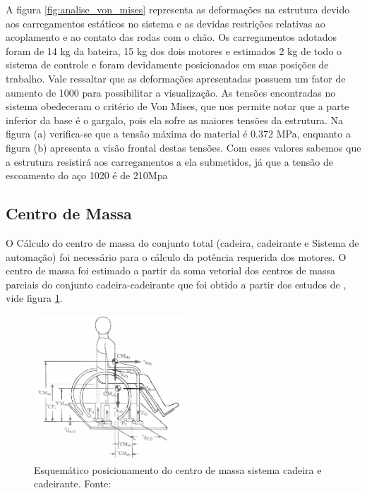 A figura \ref{fig:analise_von_mises} representa as deformações na estrutura devido aos carregamentos estáticos no sistema e as devidas restrições relativas ao acoplamento e ao contato das rodas com o chão. Os carregamentos adotados foram de 14 kg da bateira, 15 kg dos dois motores e estimados 2 kg de todo o sistema de controle e foram devidamente posicionados em suas posições de trabalho. Vale ressaltar que as deformações apresentadas possuem um fator de aumento de 1000 para possibilitar a visualização. As tensões encontradas no sistema obedeceram o critério de Von Mises, que nos permite notar que a parte inferior da base é o gargalo, pois ela sofre as maiores tensões da estrutura. Na figura (a) verifica-se que a tensão máxima do material é 0.372 MPa, enquanto a figura (b) apresenta a visão frontal destas tensões. Com esses valores sabemos que a estrutura resistirá aos carregamentos a ela submetidos, já que a tensão de escoamento do aço 1020 é de 210Mpa

\subsection{Centro de Massa}

O Cálculo do centro de massa do conjunto total (cadeira, cadeirante e Sistema de automação) foi necessário para o cálculo da potência requerida dos motores. O centro de massa foi estimado a partir da soma vetorial dos centros de massa parciais do conjunto cadeira-cadeirante que foi obtido a partir dos estudos de \cite{artigo_centro_massa}, vide figura \ref{fig:centro_massa_cadeirante}.

\begin{figure}[!htb]
\centering
\includegraphics[width = 0.5\textwidth]{figuras/resultados/centro_massa_cadeirante}
\caption{Esquemático posicionamento do centro de massa sistema cadeira e cadeirante. Fonte:\cite{artigo_centro_massa}}
\label{fig:centro_massa_cadeirante}
\end{figure}

